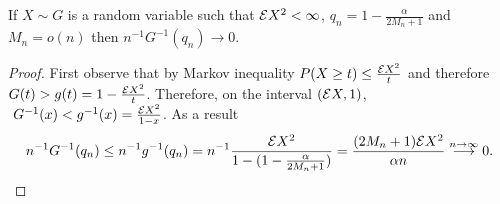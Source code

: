 \begin{lemma}
\label{lem:FoverN}
If $X \sim G$ is a random variable such that $\mathcal{E} X^2 <\infty$, $q_{n} = 1-\frac{\alpha}{2M_n+1}$ and $M_n=o(n)$ then $n^{-1} G^{-1}(q_{n}) \to 0$.
\end{lemma}  
\begin{proof}
 First observe that by Markov inequality $P(X \geq t) \leq \frac {\mathcal{E} X^2} {t} $ and therefore $G(t) > g(t) = 1 - \frac {\mathcal{E} X^2} {t}$.  Therefore, on the interval   $(\mathcal{E} X,1)$,  $ \ G^{-1}(x) < g^{-1}(x) = \frac{\ev X^2}{1-x}$. As a result 
 \begin{align}
 \label{eg:aletrnative}
 n^{-1} G^{-1}(q_{n})  \leq  n^{-1} g^{-1}(q_{n})  =n^{-1}  \frac{\mathcal{E} X^2} { 1 - (1 -\frac {\alpha} {2M_n+1})}= \frac{(2M_n+1) \mathcal{E} X^2  }{\alpha n} \overset{n \to \infty}{\longrightarrow} 0.
 \end{align} 
\end{proof} 
